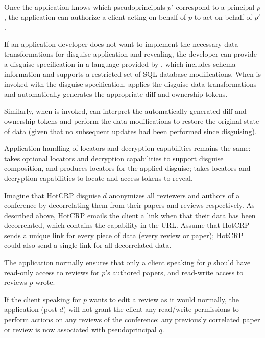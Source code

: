 Once the application knows which pseudoprincipals $p'$ correspond to a principal $p$, the application can
authorize a client acting on behalf of $p$ to act on behalf of $p'$.

If an application developer does not want to implement the necessary data transformations for disguise
application and revealing, the developer can provide a disguise specification in a language provided
by \sys, which includes schema information and supports a restricted set of SQL database
modifications. When  is invoked with the disguise specification, \sys applies the
disguise data transformations and automatically generates the appropriate diff and ownership tokens.

Similarly, when  is invoked, \sys can interpret the automatically-generated diff and
ownership tokens and perform the data modifications to restore the original state of data (given
that no subsequent updates had been performed since disguising).

Application handling of locators and decryption capabilities remains the same: 
takes optional locators and decryption capabilities to support disguise composition, and produces
locators for the applied disguise;  takes locators and decryption capabilities to
locate and access tokens to reveal.



\iffalse
Imagine that HotCRP disguise $d$ anonymizes all reviewers and authors of a conference by
decorrelating them from their papers and reviews respectively. As described above, HotCRP emails the
client a link when that their data has been decorrelated, which contains the 
capability in the URL. Assume that HotCRP sends a unique link for every piece of data (\eg every review
or paper); HotCRP could also send a single link for all decorrelated data.

The application normally ensures that only a client speaking for $p$ should have read-only access to
reviews for $p$'s authored papers, and read-write access to reviews $p$ wrote.

If the client speaking for $p$ wants to edit a review as it would normally, the application
(post-$d)$ will not grant the client any read/write permissions to perform actions on any reviews of
the conference: any previously correlated paper or review is now associated with pseudoprincipal
$q$.  

